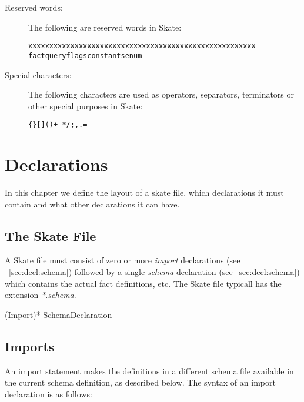 \documentclass[a4paper,11pt,twoside]{report}
\begin{document}
{{\begin{description}
\item[Reserved words:] The following are reserved words in Skate:
\begin{alltt}
  \begin{tabbing}
xxxxxxxxx \= xxxxxxxxx \= xxxxxxxxx \= xxxxxxxxx \= xxxxxxxxx \= xxxxxxxxx \kill
fact \> query \> flags \> constants \>  enum \>  \\
  \end{tabbing}
\end{alltt}

\item[Special characters:] The following characters are used as operators,
  separators, terminators or other special purposes in Skate:
\begin{alltt}

  \{ \} [ ] ( ) + - * / ; , . = 

\end{alltt}

\end{description}



\chapter{Declarations}
\label{chap:declaration}

In this chapter we define the layout of a skate file, which declarations it
must contain and what other declarations it can have.

\section{The Skate File}
A Skate file must consist of zero or more \emph{import} declarations (see
~\ref{sec:decl:schema}) followed by a single \emph{schema} declaration 
(see~\ref{sec:decl:schema}) which contains the actual fact definitions, etc.
The Skate file typicall has the extension \emph{*.schema}.

\begin{syntax}
(Import)*
SchemaDeclaration
\end{syntax}


\section{Imports}\label{sec:decl:import}
An import statement makes the definitions in a different schema file
available in the current schema definition, as described below.  The
syntax of an import declaration is as follows:

}}
\end{document}
